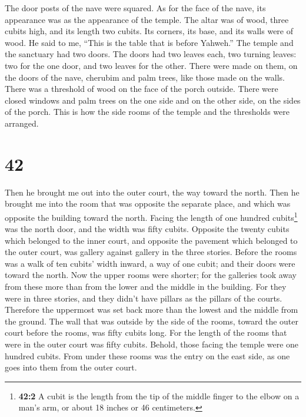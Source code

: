  The door posts of the nave were squared. As for the face
of the nave, its appearance was as the appearance of the temple.
 The altar was of wood, three cubits high, and its length
two cubits. Its corners, its base, and its walls were of wood. He said
to me, ``This is the table that is before Yahweh.''  The
temple and the sanctuary had two doors.  The doors had
two leaves each, two turning leaves: two for the one door, and two
leaves for the other.  There were made on them, on the
doors of the nave, cherubim and palm trees, like those made on the
walls. There was a threshold of wood on the face of the porch outside.
 There were closed windows and palm trees on the one side
and on the other side, on the sides of the porch. This is how the side
rooms of the temple and the thresholds were arranged.

\hypertarget{section-41}{%
\section{42}\label{section-41}}

 Then he brought me out into the outer court, the way
toward the north. Then he brought me into the room that was opposite the
separate place, and which was opposite the building toward the north.
 Facing the length of one hundred cubits\footnote{\textbf{42:2}
  A cubit is the length from the tip of the middle finger to the elbow
  on a man's arm, or about 18 inches or 46 centimeters.} was the north
door, and the width was fifty cubits.  Opposite the twenty
cubits which belonged to the inner court, and opposite the pavement
which belonged to the outer court, was gallery against gallery in the
three stories.  Before the rooms was a walk of ten cubits'
width inward, a way of one cubit; and their doors were toward the north.
 Now the upper rooms were shorter; for the galleries took
away from these more than from the lower and the middle in the building.
 For they were in three stories, and they didn't have
pillars as the pillars of the courts. Therefore the uppermost was set
back more than the lowest and the middle from the ground. 
The wall that was outside by the side of the rooms, toward the outer
court before the rooms, was fifty cubits long.  For the
length of the rooms that were in the outer court was fifty cubits.
Behold, those facing the temple were one hundred cubits. 
From under these rooms was the entry on the east side, as one goes into
them from the outer court.

